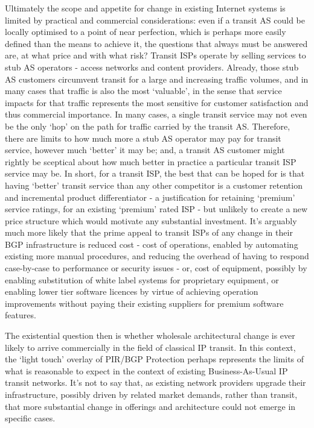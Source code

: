 Ultimately the scope and appetite for change in existing Internet systems is limited by practical and commercial considerations: even if a transit AS could be locally optimised to a point of near perfection, which is perhaps more easily defined than the means to achieve it, the questions that always must be answered are, at what price and with what risk?  Transit ISPs operate by selling services to stub AS operators - access networks and content providers.  Already, those stub AS customers circumvent transit for a large and increasing traffic volumes, and in many cases that traffic is also the most `valuable', in the sense that service impacts for that traffic represents the most  sensitive for customer satisfaction and thus commercial importance.
In many cases, a single transit service may not even be the only `hop' on the path for traffic carried by the transit AS.
Therefore, there are limits to how much more a stub AS operator may pay for transit service, however much `better' it may be; and, a transit AS customer might rightly be sceptical about how much better in practice a particular transit ISP service may be.  In short, for a transit ISP, the best that can be hoped for is that having `better' transit service than any other competitor is a customer retention and incremental product differentiator - a justification for retaining `premium' service ratings, for an existing `premium' rated ISP - but unlikely to create a new price structure which would motivate any substantial investment.
It's arguably much more likely that the prime appeal to transit ISPs of any change in their BGP infrastructure is reduced cost - cost of operations, enabled by automating existing more manual procedures, and reducing the overhead of having to respond case-by-case to performance or security issues - or, cost of equipment, possibly by enabling substitution of white label systems for proprietary equipment, or enabling lower tier software licences by virtue of achieving operation improvements without paying their existing suppliers for premium software features.

The existential question then is whether wholesale architectural change is ever likely to arrive commercially in the field of classical IP transit.  In this context, the `light touch' overlay of PIR/BGP Protection perhaps represents the limits of what is reasonable to expect in the context of existing Business-As-Usual IP transit networks.
It's not to say that, as existing network providers upgrade their infrastructure, possibly driven by related market demands, rather than transit, that more substantial change in offerings and architecture could not emerge in specific cases.

